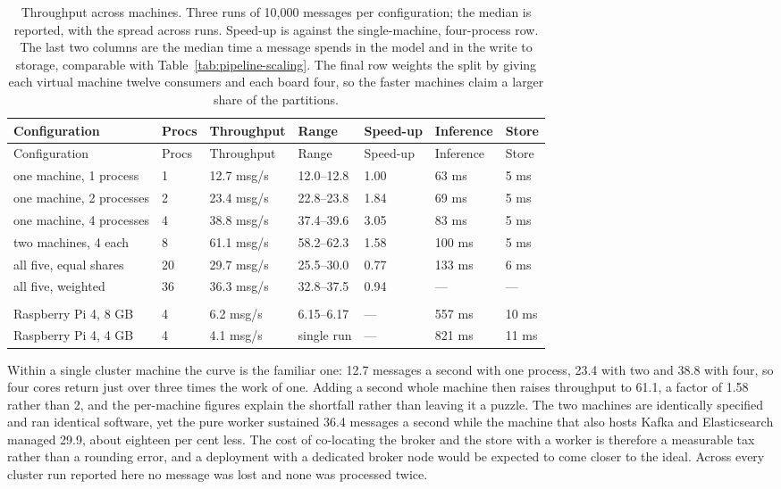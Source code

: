 {\small\setlength{\tabcolsep}{3.5pt}
\begin{longtable}{@{}lllllll@{}}
\caption{Throughput across machines. Three runs of 10,000 messages per configuration; the median is reported, with the spread across runs. Speed-up is against the single-machine, four-process row. The last two columns are the median time a message spends in the model and in the write to storage, comparable with Table~\ref{tab:pipeline-scaling}. The final row weights the split by giving each virtual machine twelve consumers and each board four, so the faster machines claim a larger share of the partitions.}\label{tab:cluster-scaling}\tabularnewline
\toprule
Configuration & Procs & Throughput & Range & Speed-up & Inference & Store \\
\midrule
\endfirsthead
\toprule
Configuration & Procs & Throughput & Range & Speed-up & Inference & Store \\
\midrule
\endhead
\bottomrule
\endlastfoot
one machine, 1 process & 1 & 12.7 msg/s & 12.0--12.8 & 1.00 & 63 ms & 5 ms \\
one machine, 2 processes & 2 & 23.4 msg/s & 22.8--23.8 & 1.84 & 69 ms & 5 ms \\
one machine, 4 processes & 4 & 38.8 msg/s & 37.4--39.6 & 3.05 & 83 ms & 5 ms \\
\addlinespace[0.4em]
two machines, 4 each & 8 & 61.1 msg/s & 58.2--62.3 & 1.58 & 100 ms & 5 ms \\
\addlinespace[0.4em]
all five, equal shares & 20 & 29.7 msg/s & 25.5--30.0 & 0.77 & 133 ms & 6 ms \\
all five, weighted & 36 & 36.3 msg/s & 32.8--37.5 & 0.94 & --- & --- \\
\addlinespace[0.4em]
\multicolumn{7}{@{}l}{\emph{a single board on its own, four processes}} \\
Raspberry Pi 4, 8 GB & 4 & 6.2 msg/s & 6.15--6.17 & --- & 557 ms & 10 ms \\
Raspberry Pi 4, 4 GB & 4 & 4.1 msg/s & single run & --- & 821 ms & 11 ms \\
\end{longtable}
}

Within a single cluster machine the curve is the familiar one: 12.7 messages a second with one process, 23.4 with two and 38.8 with four, so four cores return just over three times the work of one. Adding a second whole machine then raises throughput to 61.1, a factor of 1.58 rather than 2, and the per-machine figures explain the shortfall rather than leaving it a puzzle. The two machines are identically specified and ran identical software, yet the pure worker sustained 36.4 messages a second while the machine that also hosts Kafka and Elasticsearch managed 29.9, about eighteen per cent less. The cost of co-locating the broker and the store with a worker is therefore a measurable tax rather than a rounding error, and a deployment with a dedicated broker node would be expected to come closer to the ideal. Across every cluster run reported here no message was lost and none was processed twice.

